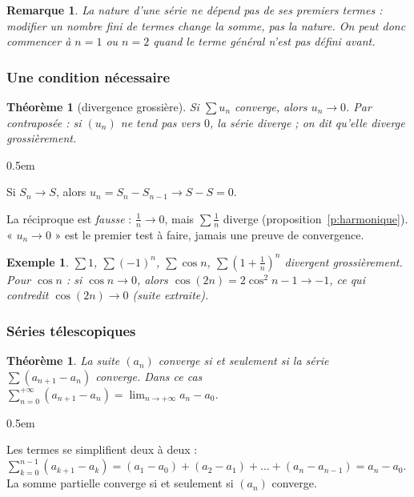 \documentclass[a4paper,11pt]{article}
\makeatletter
\numberwithin{equation}{section}
\numberwithin{figure}{section}
\numberwithin{table}{section}
\theoremstyle{enonce}
\newtheorem{theoreme}[definition]{Théorème}
\theoremstyle{exemple}
\newtheorem{exemple}[definition]{Exemple}
\theoremstyle{remarque}
\newtheorem*{remarque}{Remarque}
\renewcommand{\proofname}{Démonstration}
\renewenvironment{proof}[1][\proofname]{\par\pushQED{\qed}\normalfont
  \topsep0.5em\relax\trivlist\item[\hskip\labelsep\sffamily\itshape\color{Gris}#1.]\ignorespaces}
  {\popQED\endtrivlist\@endpefalse}
\makeatother
\begin{document}
\begin{remarque}
La nature d'une série ne dépend pas de ses premiers termes : modifier un nombre fini de termes change la somme, pas la nature.
On peut donc commencer à $n=1$ ou $n=2$ quand le terme général n'est pas défini avant.
\end{remarque}

\subsubsection*{Une condition nécessaire}

\begin{theoreme}[divergence grossière]\label{t:grossiere}
Si $\sum u_n$ converge, alors $u_n\to0$. Par contraposée : si $(u_n)$ ne tend pas vers $0$, la série diverge ; on dit qu'elle
\emph{diverge grossièrement}.
\end{theoreme}

\begin{proof}
Si $S_n\to S$, alors $u_n=S_n-S_{n-1}\to S-S=0$.
\end{proof}

\begin{attention}
La réciproque est \emph{fausse} : $\frac1n\to0$, mais $\sum\frac1n$ diverge (proposition~\ref{p:harmonique}). « $u_n\to0$ » est le
premier test à faire, jamais une preuve de convergence.
\end{attention}

\begin{exemple}
$\sum1$, $\sum(-1)^n$, $\sum\cos n$, $\sum\left(1+\frac1n\right)^n$ divergent grossièrement. Pour $\cos n$ : si $\cos n\to0$,
alors $\cos(2n)=2\cos^2n-1\to-1$, ce qui contredit $\cos(2n)\to0$ (suite extraite).
\end{exemple}

\subsubsection*{Séries télescopiques}

\begin{theoreme}\label{t:telescopique}
La suite $(a_n)$ converge si et seulement si la série $\sum(a_{n+1}-a_n)$ converge. Dans ce cas
$\displaystyle\sum_{n=0}^{+\infty}(a_{n+1}-a_n)=\lim_{n\to+\infty}a_n-a_0$.
\end{theoreme}

\begin{proof}
Les termes se simplifient deux à deux : $\sum_{k=0}^{n-1}(a_{k+1}-a_k)=(a_1-a_0)+(a_2-a_1)+\dots+(a_n-a_{n-1})=a_n-a_0$. La
somme partielle converge si et seulement si $(a_n)$ converge.
\end{proof}
\end{document}

